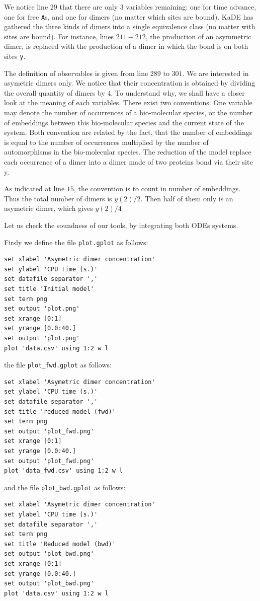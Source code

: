 \documentclass[11pt]{book}
\def\KaDE{\textsf{KaDE}}
\begin{document}
We notice line $29$ that there are only $3$ variables remaining: one for time advance, one for free \texttt{A}{}s, and one for dimers (no matter which sites are bound). {\KaDE} has gathered the three kinds of dimers into a single equivalence class (no matter with sites are bound).  For instance, lines $211-212$, the production of an asymmetric dimer, is replaced with the production of a dimer in which the bond is on both sites \texttt{y}.

The definition of observables is given from line $289$ to $301$. We are interested in asymetric dimers only. We notice that their concentration is obtained by dividing the overall quantity of dimers by $4$. To understand why, we shall have a closer look at the meaning of each variables. There exist two conventions. One variable may denote the number of occurrences of a bio-molecular species, or the number of embeddings between this bio-molecular species and the current state of the system. Both convention are related by the fact, that the number of embeddings is equal to the number of occurrences multiplied by the number of automorphisms in the bio-molecular species. The reduction of the model replace each occurrence of a dimer into a dimer made of two proteins bond via their site y.

As indicated at line $15$, the convention is to count in number of embeddings. Thus the total number of dimers is $y(2)/2$. Then half of them only is an asymetric dimer, which gives $y(2)/4$

Let us check the soundness of our tools, by integrating both ODEs systems.

Firsly we define the file \texttt{plot.gplot} as follows:
\begin{lstlisting}
set xlabel 'Asymetric dimer concentration'
set ylabel 'CPU time (s.)'
set datafile separator ','
set title 'Initial model'
set term png
set output 'plot.png'
set xrange [0:1]
set yrange [0.0:40.]
set output 'plot.png'
plot 'data.csv' using 1:2 w l
\end{lstlisting}
the file \texttt{plot\_fwd.gplot} as follows:
\begin{lstlisting}
set xlabel 'Asymetric dimer concentration'
set ylabel 'CPU time (s.)'
set datafile separator ','
set title 'reduced model (fwd)'
set term png
set output 'plot_fwd.png'
set xrange [0:1]
set yrange [0.0:40.]
set output 'plot_fwd.png'
plot 'data_fwd.csv' using 1:2 w l
\end{lstlisting}
and the file \texttt{plot\_bwd.gplot} as follows:
\begin{lstlisting}
set xlabel 'Asymetric dimer concentration'
set ylabel 'CPU time (s.)'
set datafile separator ','
set term png
set title 'Reduced model (bwd)'
set output 'plot_bwd.png'
set xrange [0:1]
set yrange [0.0:40.]
set output 'plot_bwd.png'
plot 'data.csv' using 1:2 w l
\end{lstlisting}
\end{document}
